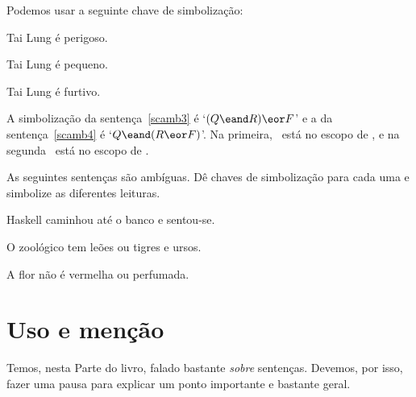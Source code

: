 Podemos usar a seguinte chave de simbolização:
\begin{ekey}
\item[R] Tai Lung é perigoso.
\item[Q] Tai Lung é pequeno.
\item[F] Tai Lung é furtivo.
\end{ekey} 

A simbolização da sentença~\ref{scamb3} é `$(Q \eand R) \eor F$' e a da sentença~\ref{scamb4} é `$Q \eand (R \eor F)$'. Na primeira, \eand~está no escopo de \eor, e na segunda \eor~está no escopo de \eand.

\practiceproblems
\solutions
\problempart As seguintes sentenças são ambíguas. Dê chaves de simbolização para cada uma e simbolize as diferentes leituras.
\begin{earg}
	\item Haskell caminhou até o banco e sentou-se.
	\item O zoológico tem leões ou tigres e ursos.
	\item A flor não é vermelha ou perfumada.
\end{earg} 

\chapter{Uso e menção}\label{s:UseMention}
Temos, nesta Parte do livro, falado bastante \emph{sobre} sentenças.
Devemos, por isso, fazer uma pausa para explicar um ponto importante e bastante geral.

